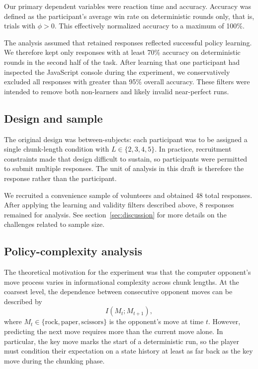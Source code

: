 \documentclass[11pt]{article}
\begin{document}
Our primary dependent variables were reaction time and accuracy. Accuracy was defined as the participant's average win rate on deterministic rounds only, that is, trials with $\phi > 0$. This effectively normalized accuracy to a maximum of 100\%.

The analysis assumed that retained responses reflected successful policy learning. We therefore kept only responses with at least 70\% accuracy on deterministic rounds in the second half of the task. After learning that one participant had inspected the JavaScript console during the experiment, we conservatively excluded all responses with greater than 95\% overall accuracy. These filters were intended to remove both non-learners and likely invalid near-perfect runs.

\subsection{Design and sample}

The original design was between-subjects: each participant was to be assigned a single chunk-length condition with $L \in \{2,3,4,5\}$. In practice, recruitment constraints made that design difficult to sustain, so participants were permitted to submit multiple responses. The unit of analysis in this draft is therefore the response rather than the participant.

We recruited a convenience sample of volunteers and obtained 48 total responses. After applying the learning and validity filters described above, 8 responses remained for analysis. See section~\ref{sec:discussion} for more details on the challenges related to sample size.

\subsection{Policy-complexity analysis}

The theoretical motivation for the experiment was that the computer opponent's move process varies in informational complexity across chunk lengths. At the coarsest level, the dependence between consecutive opponent moves can be described by
\[
I(M_t; M_{t+1}),
\]
where $M_t \in \{\text{rock}, \text{paper}, \text{scissors}\}$ is the opponent's move at time $t$. However, predicting the next move requires more than the current move alone. In particular, the key move marks the start of a deterministic run, so the player must condition their expectation on a state history at least as far back as the key move during the chunking phase.
\end{document}

